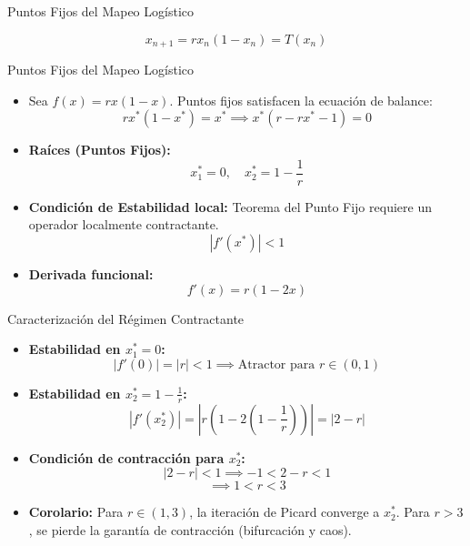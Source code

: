 \documentclass[12pt,aspectratio=169,xcolor=dvipsnames]{beamer}
\begin{document}
\begin{frame}{Puntos Fijos del Mapeo Logístico}

        $$x_{n+1} = r x_n (1 - x_n) = T(x_n)$$


\end{frame}

\begin{frame}{Puntos Fijos del Mapeo Logístico}
    \begin{itemize}
        \item Sea $f(x) = r x (1 - x)$. Puntos fijos satisfacen la ecuación de balance:
        $$r x^* (1 - x^*) = x^* \implies x^*(r - r x^* - 1) = 0$$
        
        \item \textbf{Raíces (Puntos Fijos):}
        $$x_1^* = 0, \quad x_2^* = 1 - \frac{1}{r}$$
        
        \item \textbf{Condición de Estabilidad local:} Teorema del Punto Fijo requiere un operador localmente contractante.
        $$|f'(x^*)| < 1$$
        
        \item \textbf{Derivada funcional:}
        $$f'(x) = r(1 - 2x)$$
    \end{itemize}
\end{frame}

\begin{frame}{Caracterización del Régimen Contractante}
    \begin{itemize}
        \item \textbf{Estabilidad en $x_1^* = 0$:}
        $$|f'(0)| = |r| < 1 \implies \text{Atractor para } r \in (0,1)$$
        
        \item \textbf{Estabilidad en $x_2^* = 1 - \frac{1}{r}$:}
        $$|f'(x_2^*)| = \left|r \left(1 - 2\left(1 - \frac{1}{r}\right)\right)\right| = |2 - r|$$
        
        \item \textbf{Condición de contracción para $x_2^*$:}
        $$|2 - r| < 1 \implies -1 < 2 - r < 1$$
        $$\implies 1 < r < 3$$
        
        \item \textbf{Corolario:} Para $r \in (1,3)$, la iteración de Picard converge a $x_2^*$. Para $r > 3$, se pierde la garantía de contracción (bifurcación y caos).
    \end{itemize}
\end{frame}
\end{document}

